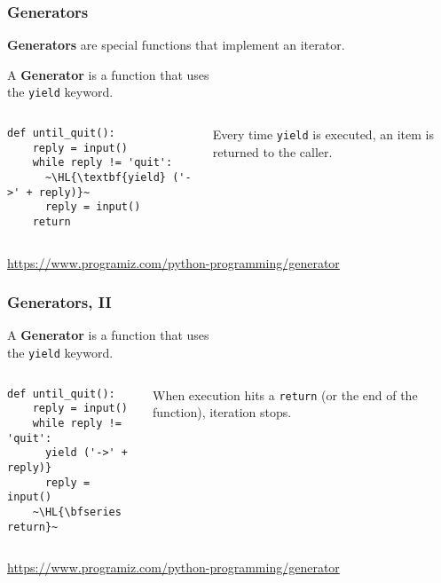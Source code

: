 \documentclass[english,serif,mathserif,xcolor=pdftex,dvipsnames,table]{beamer}
\begin{document}
\begin{frame}[fragile]
  \frametitle{Generators}
  \textbf{Generators} are special functions that implement an
  iterator.

  \+
  A \textbf{Generator} is a function that uses \\ the
  \lstinline|yield| keyword.

  \+
  \begin{columns}[c]
    \begin{column}{0.5\textwidth}
\begin{lstlisting}
def until_quit():
    reply = input()
    while reply != 'quit':
      ~\HL{\textbf{yield} ('->' + reply)}~
      reply = input()
    return
\end{lstlisting}
    \end{column}
    \begin{column}{0.4\textwidth}
      \raggedleft
      Every time \lstinline|yield| is executed, an item is returned
      to the caller.
    \end{column}
  \end{columns}

  \+
  \begin{references}
    \url{https://www.programiz.com/python-programming/generator}
  \end{references}
\end{frame}


\begin{frame}[fragile]
  \frametitle{Generators, II}
  A \textbf{Generator} is a function that uses \\ the \lstinline|yield| keyword.

  \+
  \begin{columns}[c]
    \begin{column}{0.5\textwidth}
\begin{lstlisting}
def until_quit():
    reply = input()
    while reply != 'quit':
      yield ('->' + reply)}
      reply = input()
    ~\HL{\bfseries return}~
\end{lstlisting}
    \end{column}
    \begin{column}{0.4\textwidth}
      \raggedleft
      When execution hits a \texttt{return}
      (or the end of the function),
      iteration stops.
    \end{column}
  \end{columns}

  \+
  \begin{references}
    \url{https://www.programiz.com/python-programming/generator}
  \end{references}
\end{frame}
\end{document}
